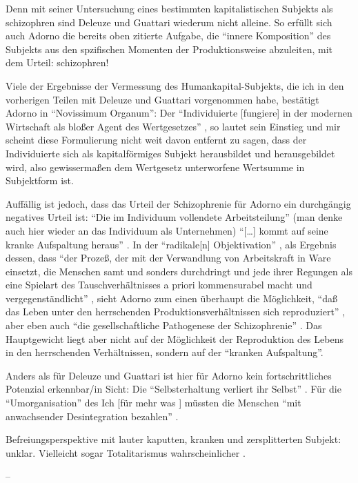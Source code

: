 \documentclass[12pt,
               DIV13,
               paper=a4,
               twoside=false,
               onehalfspacing,
               bibliography=totoc,
               toc=graduated,
               draft,
               ]{scrartcl}
\newcommand{\lips}{\dots\unkern}
\newcommand{\pc}[2]{\parencite[#1]{#2}}
\newcommand{\vgl}[2]{\parencite[vgl.][#1]{#2}}
\newcommand{\worries}[1]{\ifdraft{\textcolor{blue}{\texttt{(#1)}}}{}}
\begin{document}
Denn mit seiner Untersuchung eines bestimmten kapitalistischen
Subjekts als schizophren sind Deleuze und Guattari wiederum nicht
alleine. So erfüllt sich auch Adorno die bereits oben zitierte
Aufgabe, die "`innere Komposition"' \pc{261}{min} des Subjekts aus den
spzifischen Momenten der Produktionsweise abzuleiten, mit dem Urteil:
schizophren!

Viele der Ergebnisse der Vermessung des Humankapital-Subjekts, die ich
in den vorherigen Teilen mit Deleuze und Guattari vorgenommen habe,
bestätigt Adorno in "`Novissimum Organum"': Der "`Individuierte
[fungiere] in der modernen Wirtschaft als bloßer Agent des
Wertgesetzes"' \pc{261}{min}, so lautet sein Einstieg und mir scheint
diese Formulierung nicht weit davon entfernt zu sagen, dass der
Individuierte sich als kapitalförmiges Subjekt herausbildet und
herausgebildet wird, also gewissermaßen dem Wertgesetz unterworfene
Wertsumme in Subjektform ist.

Auffällig ist jedoch, dass das Urteil der Schizophrenie für Adorno ein
durchgängig negatives Urteil ist: "`Die im Individuum vollendete
Arbeitsteilung"' (man denke auch hier wieder an das Individuum als
Unternehmen) "`[\lips] kommt auf seine kranke Aufspaltung heraus"'
\pc{263}{min}. In der "`radikale[n] Objektivation"' \pc{263}{min}, als
Ergebnis dessen, dass "`der Prozeß, der mit der Verwandlung von
Arbeitskraft in Ware einsetzt, die Menschen samt und sonders
durchdringt und jede ihrer Regungen als eine Spielart des
Tauschverhältnisses a priori kommensurabel macht und
vergegenständlicht"' \pc{262}{min}, sieht Adorno zum einen überhaupt
die Möglichkeit, "`daß das Leben unter den herrschenden
Produktionsverhältnissen sich reproduziert"' \pc{262}{min}, aber eben
auch "`die gesellschaftliche Pathogenese der Schizophrenie"'
\pc{263}{min}. Das Hauptgewicht liegt aber nicht auf der Möglichkeit
der Reproduktion des Lebens in den herrschenden Verhältnissen, sondern
auf der "`kranken Aufspaltung"'.

Anders als für Deleuze und Guattari ist hier für Adorno kein
fortschrittliches Potenzial erkennbar/in Sicht: Die "`Selbsterhaltung
verliert ihr Selbst"' \pc{263}{min}. Für die "`Umorganisation"'
\pc{263}{min} des Ich [für mehr was \worries{?}] müssten die Menschen
"`mit anwachsender Desintegration bezahlen"' \pc{263}{min}.

Befreiungsperspektive mit lauter kaputten, kranken und zersplitterten
Subjekt: unklar. Vielleicht sogar Totalitarismus wahrscheinlicher
\vgl{263}{min}.

--
\end{document}
